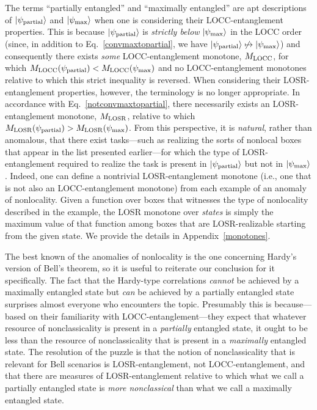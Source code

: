 \documentclass[prx,11pt,letterpaper,twocolumn,accepted=2023-11-27]{quantumarticle}
\newcommand{\ket}[1]{\left| #1 \right>}
\theoremstyle{plain}
\theoremstyle{definition}
\begin{document}
The terms ``partially entangled'' and ``maximally entangled'' are apt descriptions of
$\ket{\psi_{\rm partial}}$ and $\ket{\psi_{\rm max}}$ when one is considering their LOCC-entanglement properties.  
This is because $\ket{\psi_{\rm partial}}$ is {\em strictly below} $\ket{\psi_{\rm max}}$ in the LOCC order (since, in addition to Eq.~\eqref{convmaxtopartial}, we have $\ket{\psi_{\rm partial}} \not\mapsto \ket{\psi_{\rm max}}$) and consequently there exists {\em some} 
LOCC-entanglement monotone, $M_{\rm LOCC}$, for which $M_{\rm LOCC}( \psi_{\rm partial} ) < M_{\rm LOCC}( \psi_{\rm max} )$ and no LOCC-entanglement monotones relative to which this strict inequality is reversed.
When considering their LOSR-entanglement properties, however, the terminology is no longer appropriate.
   In accordance with Eq.~\eqref{notconvmaxtopartial}, there necessarily exists an LOSR-entanglement monotone, $M_{\rm LOSR}$, relative to which $M_{\rm LOSR}( \psi_{\rm partial} ) > M_{\rm LOSR}( \psi_{\rm max} )$. 
From this perspective, it is {\em natural}, rather than anomalous, that there exist tasks---such as realizing the sorts of nonlocal boxes that appear in the list presented earlier---for which the type of LOSR-entanglement required to realize the task is present in $|\psi_{\rm partial}\rangle$ but not in $|\psi_{\rm max}\rangle$.  Indeed, one can define a nontrivial
 LOSR-entanglement monotone (i.e., one that is not also an LOCC-entanglement monotone) from each example of an anomaly of nonlocality. Given a function over boxes that witnesses the type of nonlocality described in the example,  the LOSR monotone over {\em states} is simply the maximum value of that function among boxes that are LOSR-realizable starting from the given state. 
We provide the details in Appendix~\ref{monotones}.  



The best known of the anomalies of nonlocality is the one concerning Hardy's version of Bell's theorem, so it is useful to reiterate our conclusion for it specifically.
The fact that the Hardy-type correlations {\em cannot} be achieved by a maximally entangled state but {\em can} be achieved by a partially entangled state surprises almost everyone who encounters the topic.  Presumably this is because---based on their familiarity with LOCC-entanglement---they expect that whatever resource of nonclassicality is present in a {\em partially} entangled state, it ought to be less than 
the resource of nonclassicality that is present in a {\em maximally} entangled state.  The resolution of the puzzle is that the notion of nonclassicality that is relevant for Bell scenarios is LOSR-entanglement, not LOCC-entanglement, and that there are measures of LOSR-entanglement relative to which what we call a partially entangled state is {\em more nonclassical} than what we call a maximally entangled state. 
\end{document}
